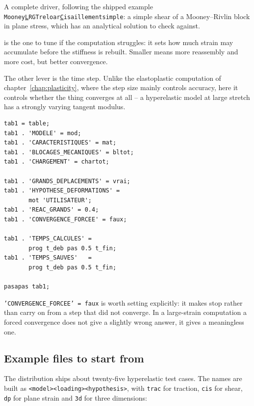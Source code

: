 \begin{castemcom}
A complete driver, following the shipped example
\texttt{Mooney\ul LRGTreloar\ul Cisaillementsimple}: a simple shear of a
Mooney--Rivlin block in plane stress, which has an analytical solution to
check against.

 is the one to tune if the computation struggles: it sets
how much strain may accumulate before the stiffness is rebuilt. Smaller means
more reassembly and more cost, but better convergence.

\medskip
The other lever is the time step. Unlike the elastoplastic computation of
chapter~\ref{chap:plasticity}, where the step size mainly controls accuracy,
here it controls whether the thing converges at all -- a hyperelastic model
at large stretch has a strongly varying tangent modulus.
\end{castemcom}
\begin{castemlines}
\begin{verbatim}
tab1 = table;
tab1 . 'MODELE' = mod;
tab1 . 'CARACTERISTIQUES' = mat;
tab1 . 'BLOCAGES_MECANIQUES' = bltot;
tab1 . 'CHARGEMENT' = chartot;

tab1 . 'GRANDS_DEPLACEMENTS' = vrai;
tab1 . 'HYPOTHESE_DEFORMATIONS' =
       mot 'UTILISATEUR';
tab1 . 'REAC_GRANDS' = 0.4;
tab1 . 'CONVERGENCE_FORCEE' = faux;

tab1 . 'TEMPS_CALCULES' =
       prog t_deb pas 0.5 t_fin;
tab1 . 'TEMPS_SAUVES'   =
       prog t_deb pas 0.5 t_fin;

pasapas tab1;
\end{verbatim}
\end{castemlines}

\noindent \texttt{'CONVERGENCE\_FORCEE' = faux} is worth setting explicitly:
it makes  stop rather than carry on from a step that did not
converge. In a large-strain computation a forced convergence does not give a
slightly wrong answer, it gives a meaningless one.

\subsection*{Example files to start from}

The distribution ships about twenty-five hyperelastic test cases. The names
are built as \texttt{<model><loading><hypothesis>}, with \texttt{trac} for
traction, \texttt{cis} for shear, \texttt{dp} for plane strain and
\texttt{3d} for three dimensions:

